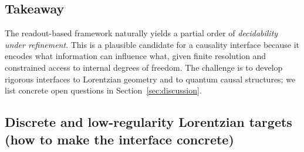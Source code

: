 \subsection{Takeaway}\label{sec:causality:takeaway}

The readout-based framework naturally yields a partial order of \emph{decidability under refinement}. This is a plausible candidate for a causality interface because it encodes what information can influence what, given finite resolution and constrained access to internal degrees of freedom. The challenge is to develop rigorous interfaces to Lorentzian geometry and to quantum causal structures; we list concrete open questions in Section~\ref{sec:discussion}.

\subsection{Discrete and low-regularity Lorentzian targets (how to make the interface concrete)}\label{sec:causality:discrete-lowreg}

